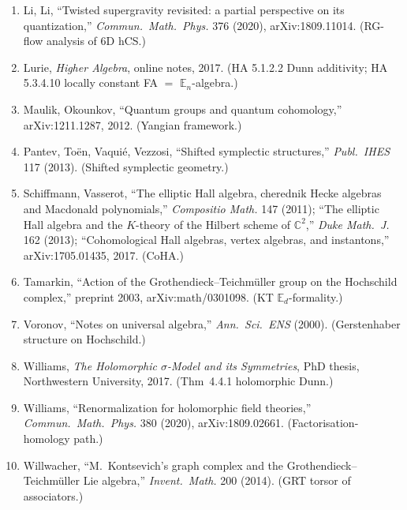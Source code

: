 \documentclass[11pt]{article}
\theoremstyle{definition}
\providecommand{\CC}{\mathbb{C}}
\begin{document}
\begin{enumerate}[leftmargin=2em]
  \item Li, Li, ``Twisted supergravity revisited: a partial
        perspective on its quantization,''
        \emph{Commun.~Math.~Phys.} 376 (2020), arXiv:1809.11014.
        (RG-flow analysis of 6D hCS.)
  \item Lurie, \emph{Higher Algebra}, online notes, 2017. (HA 5.1.2.2
        Dunn additivity; HA 5.3.4.10 locally constant FA $=$
        $\mathbb{E}_n$-algebra.)
  \item Maulik, Okounkov, ``Quantum groups and quantum cohomology,''
        arXiv:1211.1287, 2012. (Yangian framework.)
  \item Pantev, To\"en, Vaqui\'e, Vezzosi, ``Shifted symplectic
        structures,''
        \emph{Publ.~IHES} 117 (2013). (Shifted symplectic geometry.)
  \item Schiffmann, Vasserot, ``The elliptic Hall algebra,
        cherednik Hecke algebras and Macdonald polynomials,''
        \emph{Compositio Math.} 147 (2011); ``The elliptic Hall
        algebra and the $K$-theory of the Hilbert scheme of $\CC^2$,''
        \emph{Duke Math.~J.} 162 (2013); ``Cohomological Hall algebras,
        vertex algebras, and instantons,''
        arXiv:1705.01435, 2017. (CoHA.)
  \item Tamarkin, ``Action of the Grothendieck--Teichm\"uller group
        on the Hochschild complex,''
        preprint 2003, arXiv:math/0301098. (KT $\mathbb{E}_d$-formality.)
  \item Voronov, ``Notes on universal algebra,''
        \emph{Ann.~Sci.~ENS} (2000). (Gerstenhaber structure on
        Hochschild.)
  \item Williams, \emph{The Holomorphic $\sigma$-Model and its
        Symmetries}, PhD thesis, Northwestern University, 2017.
        (Thm~4.4.1 holomorphic Dunn.)
  \item Williams, ``Renormalization for holomorphic field theories,''
        \emph{Commun.~Math.~Phys.} 380 (2020), arXiv:1809.02661.
        (Factorisation-homology path.)
  \item Willwacher, ``M.~Kontsevich's graph complex and the
        Grothendieck--Teichm\"uller Lie algebra,''
        \emph{Invent.~Math.} 200 (2014). (GRT torsor of associators.)
\end{enumerate}
\end{document}
